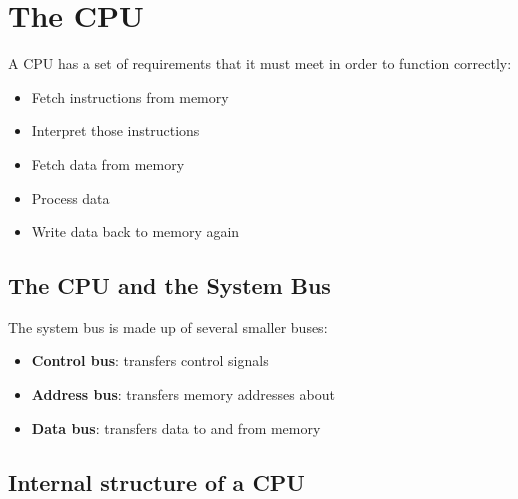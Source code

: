 \section{The CPU}\label{sec:the_cpu}

A CPU has a set of requirements that it must meet in order to function correctly:
\begin{itemize}
    \item Fetch instructions from memory
    \item Interpret those instructions
    \item Fetch data from memory
    \item Process data
    \item Write data back to memory again
\end{itemize}

\subsection{The CPU and the System Bus}\label{sub:the_cpu_and_the_system_bus}

The system bus is made up of several smaller buses:
\begin{itemize}
    \item \textbf{Control bus}: transfers control signals
    \item \textbf{Address bus}: transfers memory addresses about
    \item \textbf{Data bus}: transfers data to and from memory
\end{itemize}

\subsection{Internal structure of a CPU}\label{sub:internal_structure_of_a_cpu}

